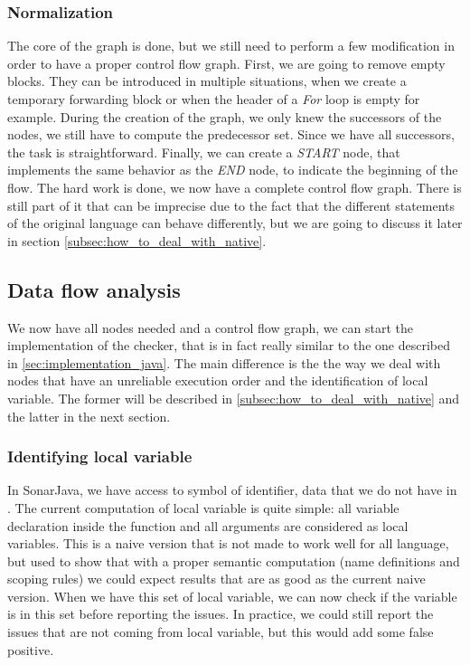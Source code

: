 \subsubsection{Normalization}
\label{subsubsec:normalization_cfg}
The core of the graph is done, but we still need to perform a few modification in order to have a proper control flow graph. 
First, we are going to remove empty blocks. 
They can be introduced in multiple situations, when we create a temporary forwarding block or when the header of a \emph{For} loop is empty for example.
During the creation of the graph, we only knew the successors of the nodes, we still have to compute the predecessor set. 
Since we have all successors, the task is straightforward. 
Finally, we can create a \emph{START} node, that implements the same behavior as the \emph{END} node, to indicate the beginning of the flow. \newline
The hard work is done, we now have a complete control flow graph. 
There is still part of it that can be imprecise due to the fact that the different statements of the original language can behave differently, but we are going to discuss it later in section \ref{subsec:how_to_deal_with_native}.

\subsection{Data flow analysis}
\label{subsec:data_flow_analysis}

We now have all nodes needed and a control flow graph, we can start the implementation of the checker, that is in fact really similar to the one described in \ref{sec:implementation_java}. 
The main difference is the the way we deal with nodes that have an unreliable execution order and the identification of local variable.
The former will be described in \ref{subsec:how_to_deal_with_native} and the latter in the next section.

\subsubsection{Identifying local variable}
\label{subsubsec:identifying_local_variable}

In SonarJava, we have access to symbol of identifier, data that we do not have in \slang{}. 
The current computation of local variable is quite simple: all variable declaration inside the function and all arguments are considered as local variables.
This is a naive version that is not made to work well for all language, but used to show that with a proper semantic computation (name definitions and scoping rules) we could expect results that are as good as the current naive version. \newline
When we have this set of local variable, we can now check if the variable is in this set before reporting the issues. 
In practice, we could still report the issues that are not coming from local variable, but this would add some false positive.

